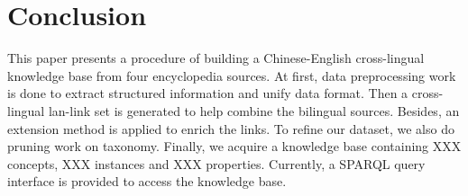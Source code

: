 \documentclass[runningheads,a4paper]{llncs}
\begin{document}

\section{Conclusion}
\label{sec:con}
This paper presents a procedure of building a Chinese-English cross-lingual knowledge base from four encyclopedia sources. At first, data preprocessing work is done to extract structured information and unify data format. Then a cross-lingual lan-link set is generated to help combine the bilingual sources. Besides, an extension method is applied to enrich the links. To refine our dataset, we also do pruning work on taxonomy. Finally, we acquire a knowledge base containing XXX concepts, XXX instances and XXX properties. Currently, a SPARQL query interface is provided to access the knowledge base. 




\end{document}
